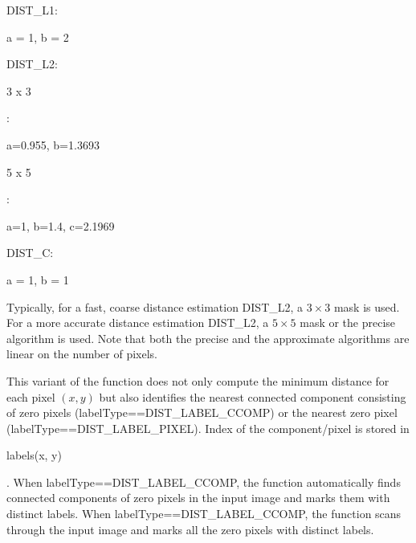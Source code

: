 \begin{DoxyItemize}
\item D\+I\+S\+T\+\_\+\+L1\+:
\begin{DoxyCode}
a = 1, b = 2 
\end{DoxyCode}

\item D\+I\+S\+T\+\_\+\+L2\+:
\begin{DoxyItemize}
\item 
\begin{DoxyCode}
3 x 3 
\end{DoxyCode}
 \+:
\begin{DoxyCode}
a=0.955, b=1.3693 
\end{DoxyCode}

\item 
\begin{DoxyCode}
5 x 5 
\end{DoxyCode}
 \+:
\begin{DoxyCode}
a=1, b=1.4, c=2.1969 
\end{DoxyCode}

\end{DoxyItemize}
\item D\+I\+S\+T\+\_\+C\+:
\begin{DoxyCode}
a = 1, b = 1 
\end{DoxyCode}
 
\end{DoxyItemize}

Typically, for a fast, coarse distance estimation D\+I\+S\+T\+\_\+\+L2, a $3\times 3$ mask is used. For a more accurate distance estimation D\+I\+S\+T\+\_\+\+L2, a $5\times 5$ mask or the precise algorithm is used. Note that both the precise and the approximate algorithms are linear on the number of pixels. 

This variant of the function does not only compute the minimum distance for each pixel $(x, y)$ but also identifies the nearest connected component consisting of zero pixels (label\+Type==D\+I\+S\+T\+\_\+\+L\+A\+B\+E\+L\+\_\+\+C\+C\+O\+MP) or the nearest zero pixel (label\+Type==D\+I\+S\+T\+\_\+\+L\+A\+B\+E\+L\+\_\+\+P\+I\+X\+EL). Index of the component/pixel is stored in
\begin{DoxyCode}
labels(x, y) 
\end{DoxyCode}
 . When label\+Type==D\+I\+S\+T\+\_\+\+L\+A\+B\+E\+L\+\_\+\+C\+C\+O\+MP, the function automatically finds connected components of zero pixels in the input image and marks them with distinct labels. When label\+Type==D\+I\+S\+T\+\_\+\+L\+A\+B\+E\+L\+\_\+\+C\+C\+O\+MP, the function scans through the input image and marks all the zero pixels with distinct labels. 

